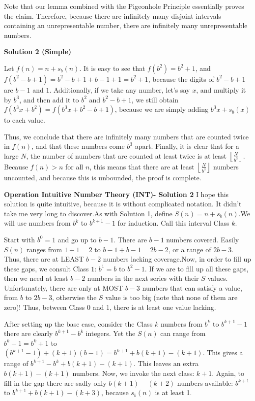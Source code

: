\begin{enumerate}
 Note that our lemma combined with the Pigeonhole Principle essentially proves the claim. Therefore, because there are infinitely many disjoint intervals containing an unrepresentable number, there are infinitely many unrepresentable numbers.

 



\textbf{Solution 2 (Simple)}

Let $f(n) = n + s_b(n)$. It is easy to see that $f(b^2) = b^2 + 1$, and $f(b^2 - b + 1) = b^2 - b + 1 + b - 1 + 1 = b^2 + 1$, because the digits of $b^2 - b + 1$ are $b-1$ and $1$. Additionally, if we take any number, let's say $x$, and multiply it by $b^3$, and then add it to $b^2$ and $b^2 - b + 1$, we still obtain $f(b^3x + b^2) = f(b^3x + b^2 - b + 1)$, because we are simply adding $b^3x + s_b(x)$ to each value. 

 Thus, we conclude that there are infinitely many numbers that are counted twice in $f(n)$, and that these numbers come $b^3$ apart. Finally, it is clear that for a large $N$, the number of numbers that are counted at least twice is at least $\left\lfloor\frac{N}{b^3}\right\rfloor$. Because $f(n) > n$ for all $n$, this means that there are at least $\left\lfloor\frac{N}{b^3}\right\rfloor$ numbers uncounted, and because this is unbounded, the proof is complete.

 \textbf{Operation Intuitive Number Theory (INT)- Solution 2} I hope this solution is quite intuitive, because it is without complicated notation. It didn't take me very long to discover.As with Solution 1, define $S(n)=n+s_b(n)$.We will use numbers from $b^k$ to $b^{k+1}-1$ for induction. Call this interval Class $k$.

 Start with $b^0=1$ and go up to $b-1$. There are $b-1$ numbers covered. Easily $S(n)$ ranges from $1+1=2$ to $b-1+b-1=2b-2$, or a range of $2b-3$. Thus, there are at LEAST $b-2$ numbers lacking coverage.Now, in order to fill up these gaps, we consult Class $1$: $b^1=b$ to $b^2-1$. If we are to fill up all these gaps, then we need at least $b-2$ numbers in the next series with their $S$ values. Unfortunately, there are only at MOST $b-3$ numbers that can satisfy a value, from $b$ to $2b-3$, otherwise the $S$ value is too big (note that none of them are zero)! Thus, between Class 0 and 1, there is at least one value lacking.

 After setting up the base case, consider the Class $k$ numbers from $b^k$ to $b^{k+1}-1$ there are clearly $b^{k+1}-b^k$ integers. Yet the $S(n)$ can range from $b^k+1=b^k+1$ to $(b^{k+1}-1)+(k+1)(b-1)=b^{k+1}+b(k+1)-(k+1)$. This gives a range of $b^{k+1}-b^k+b(k+1)-(k+1)$. This leaves an extra $b(k+1)-(k+1)$ numbers. Now, we invoke the next class: $k+1$. Again, to fill in the gap there are sadly only $b(k+1)-(k+2)$ numbers available: $b^{k+1}$ to $b^{k+1}+b(k+1)-(k+3)$, because $s_b(n)$ is at least 1.


\end{enumerate}
